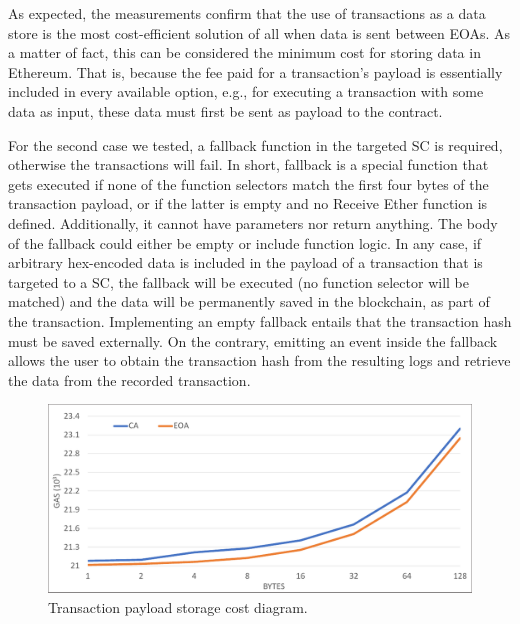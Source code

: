 As expected, the measurements confirm that the use of transactions as a data store is the most cost-efficient solution of all when data is sent between EOAs. As a matter of fact, this can be considered the minimum cost for storing data in Ethereum. That is, because the fee paid for a transaction’s payload is essentially included in every available option, e.g., for executing a transaction with some data as input, these data must first be sent as payload to the contract.

For the second case we tested, a fallback function in the targeted SC is required, otherwise the transactions will fail. In short, fallback is a special function that gets executed if none of the function selectors match the first four bytes of the transaction payload, or if the latter is empty and no Receive Ether function is defined. Additionally, it cannot have parameters nor return anything. The body of the fallback could either be empty or include function logic. In any case, if arbitrary hex-encoded data is included in the payload of a transaction that is targeted to a SC, the fallback will be executed (no function selector will be matched) and the data will be permanently saved in the blockchain, as part of the transaction. Implementing an empty fallback entails that the transaction hash must be saved externally. On the contrary, emitting an event inside the fallback allows the user to obtain the transaction hash from the resulting logs and retrieve the data from the recorded transaction.

\begin{figure}[htbp]
\centerline{\includegraphics[width=\textwidth]{figs/tx.pdf}}
\caption{Transaction payload storage cost diagram.}
\label{fig:tx}
\end{figure}

